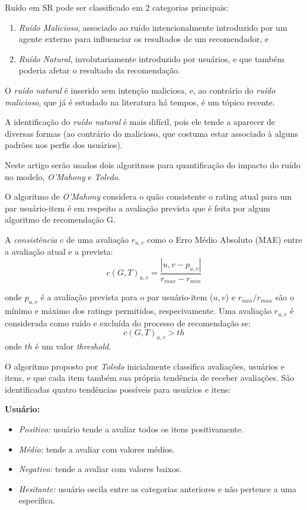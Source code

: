 \documentclass{sig-alternate}
\begin{document}
Ruído em SR pode ser classificado em 2 categorias principais:
\begin{enumerate}
	\item \emph{Ruído Malicioso}, associado ao ruído intencionalmente introduzido por um agente externo para influenciar os resultados de um recomendador, e
	\item \emph{Ruído Natural}, involutariamente introduzido por usuários, e que também poderia afetar o resultado da recomendação.
\end{enumerate}
	
O \emph{ruído natural} é inserido sem intenção maliciosa, e, ao contrário do \emph{ruído malicioso}, que já é estudado na literatura há tempos, é um tópico recente.
	
A identificação do \emph{ruído natural} é mais difícil, pois ele tende a aparecer de diversas formas (ao contrário do malicioso, que costuma estar associado à alguns padrões nos perfis dos usuários).
	
Neste artigo serão usados dois algoritmos para quantificação do impacto do ruído no modelo, \emph{O'Mahony} e \emph{Toledo}.

O algoritmo de \emph{O'Mahony} considera o quão consistente o rating atual para um par usuário-item é em respeito a avaliação prevista que é feita por algum algoritmo de recomendação G.
 
A \emph{consistência} c de uma avaliação $r_{u,v}$ como o Erro Médio Absoluto (MAE) entre a avaliação atual e a prevista:
	$$ c(G,T)_{u,v} = \frac{|{u,v} - p_{u,v}|}{r_{max} - r_{min}} $$

onde $p_{u,v}$ é a avaliação prevista para o par usuário-item ($u,v$) e $r_{min}/r_{max}$ são o mínimo e máximo dos ratings permitidos, respecivamente. Uma avaliação $r_{u,v}$ é considerada como ruído e excluída do processo de recomendação se:
	$$ c(G,T)_{u,v} > th $$
onde $th$ é um valor \emph{threshold}.

O algoritmo proposto por \emph{Toledo} inicialmente classifica avaliações, usuários e itens, e que cada item também sua própria tendência de receber avaliações. São identificadas quatro tendências possíveis para usuários e itens:

\textbf{Usuário: }
\begin{itemize}
	\item \emph{Positivo:} usuário tende a avaliar todos os itens positivamente.
	\item \emph{Médio:} tende a avaliar com valores médios.
	\item \emph{Negativo:} tende a avaliar com valores baixos.
	\item \emph{Hesitante:} usuário oscila entre as categorias anteriores e não pertence a uma específica.
\end{itemize}
\end{document}
